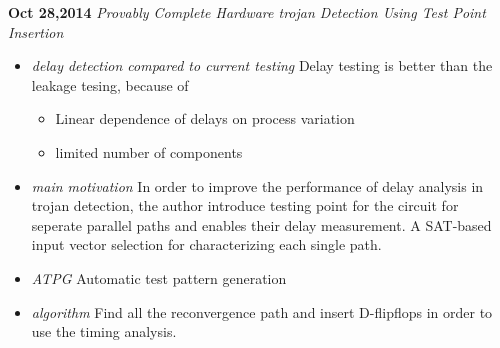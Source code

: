 \documentclass[]{article}
\begin{document}
\noindent \textbf{Oct 28,2014}
\textit{Provably Complete Hardware trojan Detection Using Test Point Insertion}
\indent		\begin{itemize}
            \item \textit{delay detection compared to current testing} Delay
            testing is better than the leakage tesing, because of 
                \begin{itemize}
                    \item Linear dependence of delays on process variation
                    \item limited number of components
                \end{itemize}
            \item \textit{main motivation} In order to improve the performance
            of delay analysis in trojan detection, the author introduce testing
            point for the circuit for seperate parallel paths and enables their
            delay measurement.  A SAT-based input vector selection for
            characterizing each single path.
            \item \textit{ATPG} Automatic test pattern generation
            \item \textit{algorithm} Find all the reconvergence path and insert
            D-flipflops in order to use the timing analysis.
       		\end{itemize}
\end{document}
